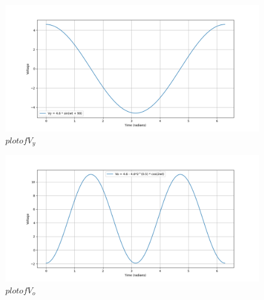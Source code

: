 \documentclass[journal,12pt,twocolumn]{IEEEtran}
\theoremstyle{remark}
\begin{document}
\begin{figure}[h]
      \centering
       \includegraphics[width=1\linewidth]{2023/IN/61/figs/V_y.png} %
        \caption{$plot of V_y$}
\end{figure}
\begin{figure}[h]
      \centering
       \includegraphics[width=1\linewidth]{2023/IN/61/figs/V_o.png} %
        \caption{$plot of V_o$}
\end{figure}
\end{document}
